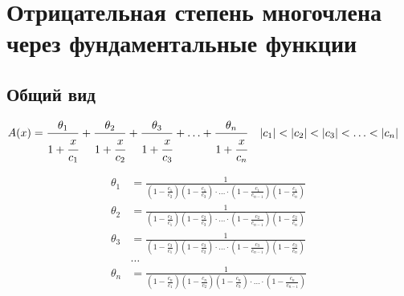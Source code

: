 
\section{Отрицательная степень многочлена через фундаментальные функции}

\subsection{Общий вид}

\begin{equation*} \begin{aligned}
&A(x) =
  \frac{\theta_1}{1 + \cfrac{x}{c_1}}
+ \frac{\theta_2}{1 + \cfrac{x}{c_2}}
+ \frac{\theta_3}{1 + \cfrac{x}{c_3}}
+ \ldots
+ \frac{\theta_n}{1 + \cfrac{x}{c_n}} &
&|c_1| < |c_2| < |c_3| < \ldots < |c_n|
\end{aligned} \end{equation*}

\begin{equation*} \begin{aligned}
\theta_1 &= \frac{1}{
  \left(1 - \displaystyle \frac{c_1}{c_2} \right)
  \left(1 - \displaystyle \frac{c_1}{c_3} \right)
  \cdot \ldots \cdot
  \left(1 - \displaystyle \frac{c_1}{c_{n - 1}} \right)
  \left(1 - \displaystyle \frac{c_1}{c_n} \right)} \\
\theta_2 &= \frac{1}{
  \left(1 - \displaystyle \frac{c_2}{c_1} \right)
  \left(1 - \displaystyle \frac{c_2}{c_3} \right)
  \cdot \ldots \cdot
  \left(1 - \displaystyle \frac{c_2}{c_{n - 1}} \right)
  \left(1 - \displaystyle \frac{c_2}{c_n} \right)} \\
\theta_3 &= \frac{1}{
  \left(1 - \displaystyle \frac{c_3}{c_1} \right)
  \left(1 - \displaystyle \frac{c_3}{c_2} \right)
  \cdot \ldots \cdot
  \left(1 - \displaystyle \frac{c_3}{c_{n - 1}} \right)
  \left(1 - \displaystyle \frac{c_3}{c_n} \right)} \\
&\ldots \\
\theta_n &= \frac{1}{
  \left(1 - \displaystyle \frac{c_n}{c_1} \right)
  \left(1 - \displaystyle \frac{c_n}{c_2} \right)
  \left(1 - \displaystyle \frac{c_n}{c_3} \right)
  \cdot \ldots \cdot
  \left(1 - \displaystyle \frac{c_n}{c_{n - 1}} \right)} \\
\end{aligned} \end{equation*}

